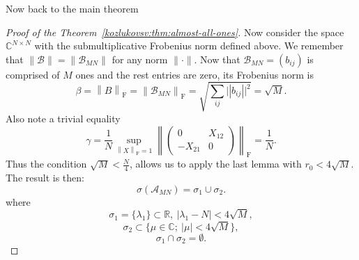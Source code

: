 Now back to the main theorem
\begin{proof}[Proof of the Theorem~\ref{kozlukovsv:thm:almost-all-ones}]
    Now consider the space \( \mathbb{C}^{N{\times}N} \)
        with the submultiplicative Frobenius norm defined above.
    We remember that  \( \|\mathcal{B}\|=\|\mathscr{B}_{MN}\| \) for any norm \( \|\cdot\| \).
    Now that \( \mathscr{B}_{MN}=(b_{ij}) \) is comprised of \( M \) ones and the rest entries are zero,
        its Frobenius norm is
    \[
        \beta = {\left\|B\right\|}_{\mathrm{F}} =
        {\left\|\mathscr{B}_{MN}\right\|}_{\mathrm{F}} =
        \sqrt{\sum_{ij} \lvert |b_{ij}|\rvert^2} =
        \sqrt{M}.
        \]
    Also note a trivial equality
    \[
        \gamma = \frac1N
                \sup_{{\left\|X\right\|}_{\mathrm{F}}=1}{\left\|\begin{pmatrix}0 & X_{12} \\ -X_{21} & 0\end{pmatrix}\right\|}_{\mathrm{F}}
                = \frac1N. \]
    Thus the condition
        \( \sqrt{M} < \frac{N}{4} \),
        allows us to apply the last lemma
        with 
        \(
            r_0{<}4\sqrt{M}.
            \)
    The result is then:
        \[ \sigma(\mathscr{A}_{MN}) = \sigma_1 \cup \sigma_2. \]
        where
        \[ \sigma_1{=}\{ \lambda_1 \}{\subset}\mathbb{R},\ \lvert \lambda_1{-}N \rvert{<}4\sqrt{M}, \]
        \[ \sigma_2{\subset}\{ \mu{\in}\mathbb{C};\ \lvert\mu\rvert{<}4\sqrt{M} \}, \]
        \[ \sigma_1{\cap}\sigma_2{=}\emptyset. \]
    \end{proof}
